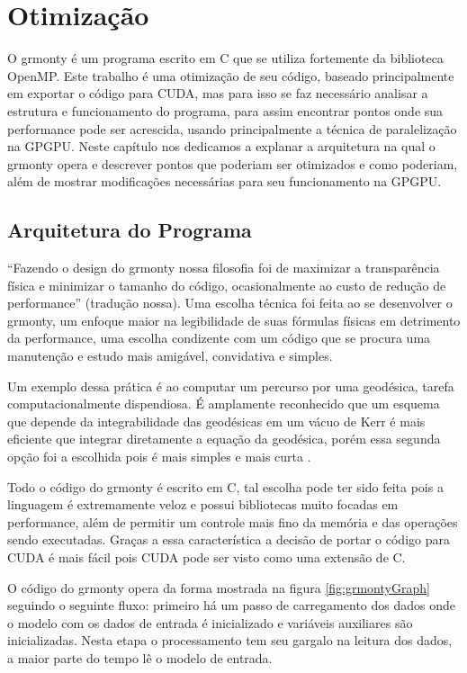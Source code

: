 \chapter{Otimização}
\label{cap:otimizacao}
  O grmonty é um programa escrito em C que se utiliza fortemente da biblioteca OpenMP.
  Este trabalho é uma otimização de seu código, baseado principalmente em exportar
  o código para CUDA, mas para isso se faz necessário analisar a estrutura e
  funcionamento do programa, para assim encontrar pontos onde sua performance
  pode ser acrescida, usando principalmente a técnica de paralelização na GPGPU.
  Neste capítulo nos dedicamos a explanar a arquitetura na qual o grmonty opera
  e descrever pontos que poderiam ser otimizados e como poderiam, além de mostrar
  modificações necessárias para seu funcionamento na GPGPU.

\section{Arquitetura do Programa}
  ``Fazendo o design do grmonty nossa filosofia foi de maximizar a transparência
  física e minimizar o tamanho do código, ocasionalmente ao custo de redução de
  performance'' \citep{Dolence:09} (tradução nossa). Uma escolha técnica foi feita
  ao se desenvolver o grmonty, um enfoque maior na legibilidade de suas fórmulas
  físicas em detrimento da performance, uma escolha condizente com um
  código que se procura uma manutenção e estudo mais amigável, convidativa e simples.

  Um exemplo dessa prática é ao computar um percurso por uma geodésica, tarefa
  computacionalmente dispendiosa. É amplamente reconhecido \citep{ynogkm:13} que
  um esquema que depende da integrabilidade das geodésicas em um vácuo de Kerr é
  mais eficiente que integrar diretamente a equação da geodésica, porém essa segunda
  opção foi a escolhida pois é mais simples e mais curta \citep{Dolence:09}.

  Todo o código do grmonty é escrito em C, tal escolha pode ter sido feita pois
  a linguagem é extremamente veloz e possui bibliotecas muito focadas em performance, além de permitir um controle mais fino da memória e das operações sendo executadas. Graças a essa característica a decisão de portar o código para CUDA é mais fácil pois CUDA pode ser visto como uma extensão de C.

  O código do grmonty opera da forma mostrada na figura \ref{fig:grmontyGraph} seguindo o seguinte fluxo: primeiro há um passo de carregamento dos dados onde o modelo com os dados de entrada é inicializado e variáveis auxiliares são inicializadas. Nesta etapa o processamento tem seu gargalo na leitura dos dados, a maior parte do tempo lê o modelo de entrada.

